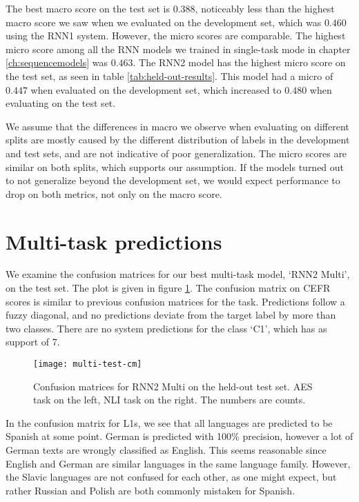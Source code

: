 The best macro \FI score on the test set is $0.388$, noticeably less than the
highest macro \FI score we saw when we evaluated on the development set,
which was $0.460$ using the RNN1 system. However, the micro \FI scores are
comparable. The highest micro \FI score among all the RNN models we trained
in single-task mode in chapter \ref{ch:sequencemodels} was $0.463$. The RNN2
model has the highest micro \FI score on the test set, as seen in table
\ref{tab:held-out-results}. This model had a micro \FI of $0.447$ when
evaluated on the development set, which increased to $0.480$ when evaluating
on the test set.

We assume that the differences in macro \FI we observe when evaluating on
different splits are mostly caused by the different distribution of labels in
the development and test sets, and are not indicative of poor generalization.
The micro \FI scores are similar on both splits, which supports our
assumption. If the models turned out to not generalize beyond the development
set, we would expect performance to drop on both metrics, not only on the
macro \FI score.


\section{Multi-task predictions}

We examine the confusion matrices for our best multi-task model, `RNN2
Multi', on the test set. The plot is given in figure \ref{fig:multi-test-cm}.
The confusion matrix on CEFR scores is similar to previous confusion
matrices for the task. Predictions follow a fuzzy diagonal, and no predictions
deviate from the target label by more than two classes. There are no system
predictions for the class `C1', which has as support of 7.

\begin{figure}
  \centering
  \texttt{[image: multi-test-cm]}
  
  \caption[Multi-task confusion matrices]{
    Confusion matrices for RNN2 Multi on the held-out test set. \ac{AES} task
    on the left, \ac{NLI} task on the right. The numbers are counts.
  }
  \label{fig:multi-test-cm}
\end{figure}

In the confusion matrix for \acp{L1}, we see that all languages are predicted
to be Spanish at some point. German is predicted with 100\% precision,
however a lot of German texts are wrongly classified as English. This seems
reasonable since English and German are similar languages in the same
language family. However, the Slavic languages are not confused for each
other, as one might expect, but rather Russian and Polish are both commonly
mistaken for Spanish.


